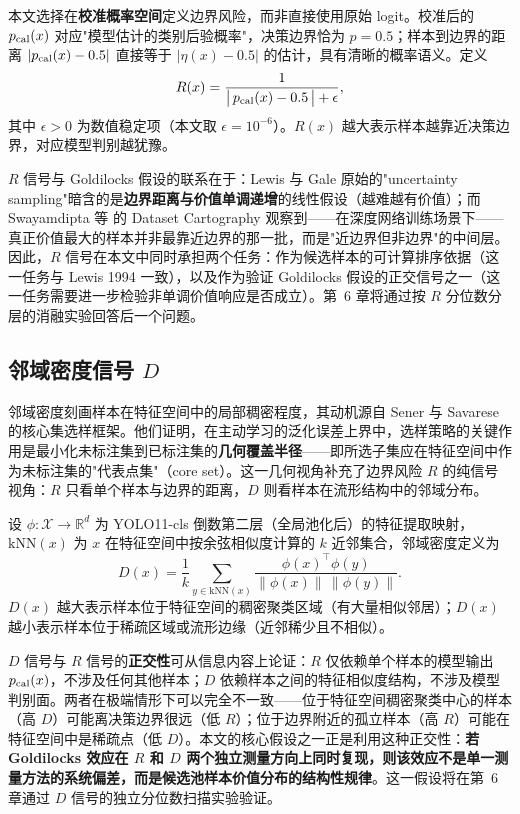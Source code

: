 \documentclass[UTF8,openany,12pt]{ctexbook}
\begin{document}
本文选择在\textbf{校准概率空间}定义边界风险，而非直接使用原始 logit。校准后的 $p_{\rm cal}(x)$ 对应"模型估计的类别后验概率"，决策边界恰为 $p = 0.5$；样本到边界的距离 $|p_{\rm cal}(x) - 0.5|$ 直接等于 $|\eta(x) - 0.5|$ 的估计，具有清晰的概率语义。定义
\begin{equation}
R(x) = \frac{1}{\bigl|\,p_{\rm cal}(x) - 0.5\,\bigr| + \epsilon},
\label{eq:signal-R}
\end{equation}
其中 $\epsilon > 0$ 为数值稳定项（本文取 $\epsilon = 10^{-6}$）。$R(x)$ 越大表示样本越靠近决策边界，对应模型判别越犹豫。

$R$ 信号与 Goldilocks 假设的联系在于：Lewis 与 Gale\cite{lewis1994sequential} 原始的"uncertainty sampling"暗含的是\textbf{边界距离与价值单调递增}的线性假设（越难越有价值）；而 Swayamdipta 等\cite{swayamdipta2020cartography} 的 Dataset Cartography 观察到——在深度网络训练场景下——真正价值最大的样本并非最靠近边界的那一批，而是"近边界但非边界"的中间层。因此，$R$ 信号在本文中同时承担两个任务：作为候选样本的可计算排序依据（这一任务与 Lewis 1994 一致），以及作为验证 Goldilocks 假设的正交信号之一（这一任务需要进一步检验非单调价值响应是否成立）。第~6 章将通过按 $R$ 分位数分层的消融实验回答后一个问题。

\subsection{邻域密度信号 $D$}
邻域密度刻画样本在特征空间中的局部稠密程度，其动机源自 Sener 与 Savarese\cite{sener2018active} 的核心集选样框架。他们证明，在主动学习的泛化误差上界中，选样策略的关键作用是最小化未标注集到已标注集的\textbf{几何覆盖半径}——即所选子集应在特征空间中作为未标注集的"代表点集"（core set）。这一几何视角补充了边界风险 $R$ 的纯信号视角：$R$ 只看单个样本与边界的距离，$D$ 则看样本在流形结构中的邻域分布。

设 $\phi : \mathcal{X} \to \mathbb{R}^d$ 为 YOLO11-cls 倒数第二层（全局池化后）的特征提取映射，$\mathrm{kNN}(x)$ 为 $x$ 在特征空间中按余弦相似度计算的 $k$ 近邻集合，邻域密度定义为
\begin{equation}
D(x) = \frac{1}{k}\sum_{y \in \mathrm{kNN}(x)} \frac{\phi(x)^{\top}\phi(y)}{\|\phi(x)\|\,\|\phi(y)\|}.
\label{eq:signal-D}
\end{equation}
$D(x)$ 越大表示样本位于特征空间的稠密聚类区域（有大量相似邻居）；$D(x)$ 越小表示样本位于稀疏区域或流形边缘（近邻稀少且不相似）。

$D$ 信号与 $R$ 信号的\textbf{正交性}可从信息内容上论证：$R$ 仅依赖单个样本的模型输出 $p_{\rm cal}(x)$，不涉及任何其他样本；$D$ 依赖样本之间的特征相似度结构，不涉及模型判别面。两者在极端情形下可以完全不一致——位于特征空间稠密聚类中心的样本（高 $D$）可能离决策边界很远（低 $R$）；位于边界附近的孤立样本（高 $R$）可能在特征空间中是稀疏点（低 $D$）。本文的核心假设之一正是利用这种正交性：\textbf{若 Goldilocks 效应在 $R$ 和 $D$ 两个独立测量方向上同时复现，则该效应不是单一测量方法的系统偏差，而是候选池样本价值分布的结构性规律}。这一假设将在第~6 章通过 $D$ 信号的独立分位数扫描实验验证。
\end{document}
